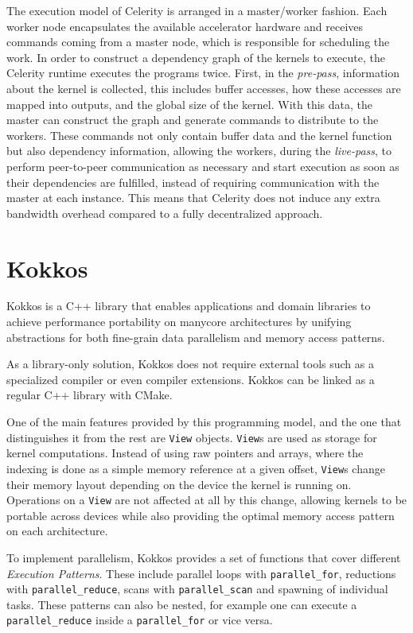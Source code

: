 The execution model of Celerity is arranged in a master/worker fashion. Each worker node encapsulates the available accelerator hardware and receives commands coming from a master node, which is responsible for scheduling the work. In order to construct a dependency graph of the kernels to execute, the Celerity runtime executes the programs twice. First, in the \textit{pre-pass}, information about the kernel is collected, this includes buffer accesses, how these accesses are mapped into outputs, and the global size of the kernel. With this data, the master can construct the graph and generate commands to distribute to the workers. These commands not only contain buffer data and the kernel function but also dependency information, allowing the workers, during the \textit{live-pass}, to perform peer-to-peer communication as necessary and start execution as soon as their dependencies are fulfilled, instead of requiring communication with the master at each instance. This means that Celerity does not induce any extra bandwidth overhead compared to a fully decentralized approach.

\section{Kokkos}
Kokkos \cite{kokkos} is a C++ library that enables applications and domain libraries to achieve performance portability on manycore architectures by unifying abstractions for both fine-grain data parallelism and memory access patterns.

As a library-only solution, Kokkos does not require external tools such as a specialized compiler or even compiler extensions. Kokkos can be linked as a regular C++ library with CMake.

One of the main features provided by this programming model, and the one that distinguishes it from the rest are \texttt{View} objects. \texttt{View}s are used as storage for kernel computations. Instead of using raw pointers and arrays, where the indexing is done as a simple memory reference at a given offset, \texttt{View}s change their memory layout depending on the device the kernel is running on. Operations on a \texttt{View} are not affected at all by this change, allowing kernels to be portable across devices while also providing the optimal memory access pattern on each architecture.

To implement parallelism, Kokkos provides a set of functions that cover different \textit{Execution Patterns}. These include parallel loops with \texttt{parallel\_for}, reductions with \texttt{parallel\_reduce}, scans with \texttt{parallel\_scan} and spawning of individual tasks. These patterns can also be nested, for example one can execute a \texttt{parallel\_reduce} inside a \texttt{parallel\_for} or vice versa.

